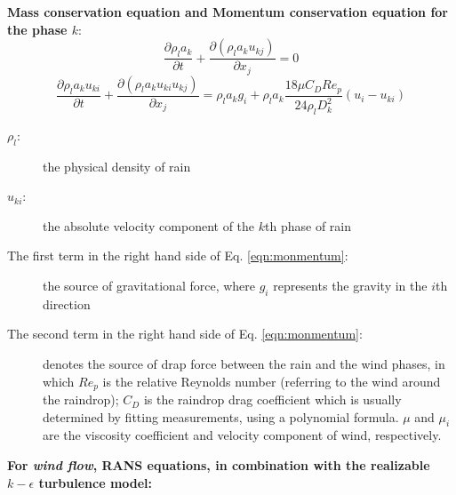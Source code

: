 \textbf{Mass conservation equation and Momentum conservation equation for the phase $k$}:
\begin{equation}
\frac{\partial \rho_l a_k}{\partial t}+\frac{\partial \left(\rho_l a_k u_{kj}\right)}{\partial x_j} = 0
\end{equation}
\begin{equation}\label{eqn:monmentum}
\frac{\partial \rho_l a_k u_{ki}}{\partial t} + \frac{\partial \left(\rho_l a_k u_{ki} u_{kj}\right)}{\partial x_j} =
\rho_l a_k g_i + \rho_l a_k \frac{18\mu C_D Re_p}{24 \rho_l D_k^2}\left(u_i-u_{ki}\right)
\end{equation}
\begin{description}
\item[$\rho_l$: ] the physical density of rain
\item[$u_{ki}$: ] the absolute velocity component of the $k$th phase of rain
\item[The first term in the right hand side of Eq. \ref{eqn:monmentum}: ] the source of gravitational force, where $g_i$ represents the gravity in the $i$th direction
\item[The second term in the right hand side of Eq. \ref{eqn:monmentum}: ] denotes the source of drap force between the rain and the wind phases, in which $Re_p$ is the relative Reynolds number (referring to the wind around the raindrop); $C_D$ is the raindrop drag coefficient which is usually determined by fitting measurements, using a polynomial formula. $\mu$ and $\mu_i$ are the viscosity coefficient and velocity component of wind, respectively.
\end{description}

\textbf{For \textit{wind flow}, RANS equations, in combination with the realizable $k-\epsilon$ turbulence model:}\par 
